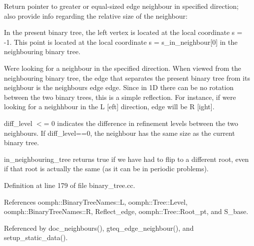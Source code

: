 Return pointer to greater or equal-\/sized edge neighbour in specified {\ttfamily direction}; also provide info regarding the relative size of the neighbour\+:
\begin{DoxyItemize}
\item In the present binary tree, the left vertex is located at the local coordinate s = -\/1. This point is located at the local coordinate s = {\ttfamily s\+\_\+in\+\_\+neighbour}\mbox{[}0\mbox{]} in the neighbouring binary tree.
\item We\textquotesingle{}re looking for a neighbour in the specified {\ttfamily direction}. When viewed from the neighbouring binary tree, the edge that separates the present binary tree from its neighbour is the neighbour\textquotesingle{}s {\ttfamily edge} edge. Since in 1D there can be no rotation between the two binary trees, this is a simple reflection. For instance, if we\textquotesingle{}re looking for a neighhbour in the {\ttfamily L} \mbox{[}eft\mbox{]} {\ttfamily direction}, {\ttfamily edge} will be {\ttfamily R} \mbox{[}ight\mbox{]}.
\item {\ttfamily diff\+\_\+level} $<$= 0 indicates the difference in refinement levels between the two neighbours. If {\ttfamily diff\+\_\+level==0}, the neighbour has the same size as the current binary tree.
\item {\ttfamily in\+\_\+neighbouring\+\_\+tree} returns true if we have had to flip to a different root, even if that root is actually the same (as it can be in periodic problems). 
\end{DoxyItemize}

Definition at line 179 of file binary\+\_\+tree.\+cc.



References oomph\+::\+Binary\+Tree\+Names\+::L, oomph\+::\+Tree\+::\+Level, oomph\+::\+Binary\+Tree\+Names\+::R, Reflect\+\_\+edge, oomph\+::\+Tree\+::\+Root\+\_\+pt, and S\+\_\+base.



Referenced by doc\+\_\+neighbours(), gteq\+\_\+edge\+\_\+neighbour(), and setup\+\_\+static\+\_\+data().

\mbox{\label{classoomph_1_1BinaryTree_aef4ea20b1eb9525513a505975a61d35d}} 

